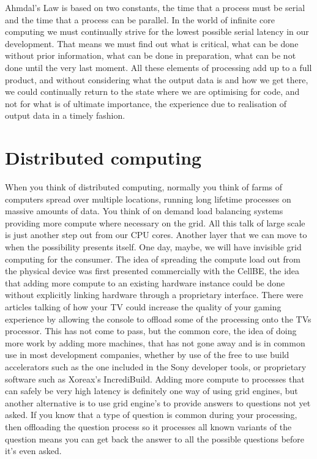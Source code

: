 Ahmdal's Law is based on two constants, the time that a process must be serial
and the time that a process can be parallel. In the world of infinite core
computing we must continually strive for the lowest possible serial latency in
our development. That means we must find out what is critical, what can be done
without prior information, what can be done in preparation, what can be not
done until the very last moment. All these elements of processing add up to a
full product, and without considering what the output data is and how we get
there, we could continually return to the state where we are optimising for
code, and not for what is of ultimate importance, the experience due to
realisation of output data in a timely fashion.

\section{Distributed computing}

When you think of distributed computing, normally you think of farms of
computers spread over multiple locations, running long lifetime processes on
massive amounts of data. You think of on demand load balancing systems
providing more compute where necessary on the grid. All this talk of large
scale is just another step out from our CPU cores. Another layer that we can
move to when the possibility presents itself. One day, maybe, we will have
invisible grid computing for the consumer. The idea of spreading the compute
load out from the physical device was first presented commercially with the
CellBE, the idea that adding more compute to an existing hardware instance
could be done without explicitly linking hardware through a proprietary
interface. There were articles talking of how your TV could increase the
quality of your gaming experience by allowing the console to offload some of
the processing onto the TVs processor. This has not come to pass, but the
common core, the idea of doing more work by adding more machines, that has not
gone away and is in common use in most development companies, whether by use of
the free to use build accelerators such as the one included in the Sony
developer tools, or proprietary software such as Xoreax's IncrediBuild. Adding
more compute to processes that can safely be very high latency is definitely
one way of using grid engines, but another alternative is to use grid engine's
to provide answers to questions not yet asked. If you know that a type of
question is common during your processing, then offloading the question process
so it processes all known variants of the question means you can get back the
answer to all the possible questions before it's even asked.

